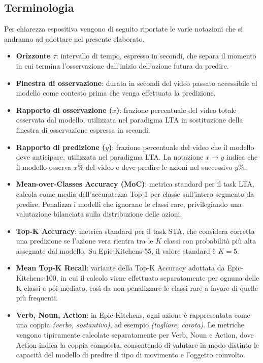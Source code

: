\subsection{Terminologia}
Per chiarezza espositiva vengono di seguito riportate le varie notazioni che si andranno ad adottare nel presente elaborato.
\begin{itemize}
    \item \textbf{Orizzonte $\tau$}: intervallo di tempo, espresso in secondi, che separa il momento in cui termina l'osservazione dall'inizio dell'azione futura da predire.
    \item \textbf{Finestra di osservazione}: durata in secondi del video passato accessibile al modello come contesto prima che venga effettuata la predizione.
    \item \textbf{Rapporto di osservazione (\(x\))}: frazione percentuale del video totale osservata dal modello, utilizzata nel paradigma LTA in sostituzione della finestra di osservazione espressa in secondi.
    \item \textbf{Rapporto di predizione (\(y\))}: frazione percentuale del video che il modello deve anticipare, utilizzata nel paradigma LTA. La notazione \(x\)$\to$\(y\) indica che il modello osserva \(x\)\% del video e deve predire le azioni nel successivo \(y\)\%.
    \item \textbf{Mean-over-Classes Accuracy (MoC)}: metrica standard per il task LTA, calcola come media dell'accuratezza Top-1 per classe sull'intero segmento da predire. Penalizza i modelli che ignorano le classi rare, privilegiando una valutazione bilanciata sulla distribuzione delle azioni.
    \item \textbf{Top-K Accuracy}: metrica standard per il task STA, che considera corretta una predizione se l'azione vera rientra tra le \(K\) classi con probabilità più alta assegnate dal modello. Su Epic-Kitchens-55, il valore standard è \(K = 5\).
    \item \textbf{Mean Top-K Recall}: variante della Top-K Accuracy adottata da Epic-Kitchens-100, in cui il calcolo viene effettuato separatamente per ognuna delle K classi e poi mediato, così da non penalizzare le classi rare a favore di quelle più frequenti.
    \item \textbf{Verb, Noun, Action}: in Epic-Kitchens, ogni azione è rappresentata come una coppia \textit{(verbo, sostantivo)}, ad esempio \textit{(tagliare, carota)}. Le metriche vengono tipicamente calcolate separatamente per Verb, Noun e Action, dove Action indica la coppia composta, consentendo di valutare in modo distinto le capacità del modello di predire il tipo di movimento e l'oggetto coinvolto.
\end{itemize}

